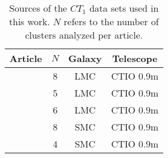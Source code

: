 \documentclass[referee]{aa}
\begin{document}
\begin{table} 
\centering
 \caption{Sources of the $CT_1$ data sets used in this work. $N$ refers to the
 number of clusters analyzed per article.}
\label{tab:literature}
 \begin{tabular}{l c c c}
\hline\hline
Article & $N$ & Galaxy & Telescope \\
\hline
\cite{Geisler_2003} & 8 & LMC & CTIO 0.9m \\ 
\cite{Piatti_2003a} & 5 & LMC & CTIO 0.9m \\ 
\cite{Piatti_2003b} & 6 & LMC & CTIO 0.9m \\ 
\cite{Piatti_2005} & 8 & SMC & CTIO 0.9m \\ 
\cite{Piatti_2007a} & 4 & SMC & CTIO 0.9m \\ 

\end{tabular}
\end{table}
\end{document}
